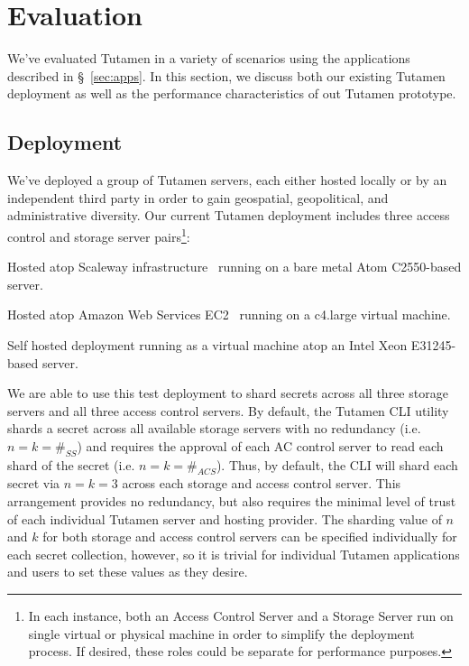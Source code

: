 \section{Evaluation}
\label{sec:eval}

We've evaluated Tutamen in a variety of scenarios using the
applications described in \S~\ref{sec:apps}. In this section, we
discuss both our existing Tutamen deployment as well as the
performance characteristics of out Tutamen prototype.

\subsection{Deployment}
\label{sec:eval:deployment}

We've deployed a group of Tutamen servers, each either hosted locally
or by an independent third party in order to gain geospatial,
geopolitical, and administrative diversity. Our current Tutamen
deployment includes three access control and storage server
pairs\footnote{In each instance, both an Access Control Server and a
  Storage Server run on single virtual or physical machine in order to
  simplify the deployment process. If desired, these roles could be
  separate for performance purposes.}:

\begin{packed_desc}
\item[Paris, France:] Hosted atop Scaleway infrastructure~\cite{scaleway}
  running on a bare metal Atom C2550-based server.
\item[North Virginia:] Hosted atop Amazon Web Services
  EC2~\cite{amazon-ec2} running on a c4.large virtual machine.
\item[Boulder, CO:] Self hosted deployment running as a virtual machine
  atop an Intel Xeon E31245-based server.
\end{packed_desc}

We are able to use this test deployment to shard secrets across all
three storage servers and all three access control servers. By
default, the Tutamen CLI utility shards a secret across all available
storage servers with no redundancy (i.e. $n=k=\#_{SS}$) and requires
the approval of each AC control server to read each shard of the
secret (i.e. $n=k=\#_{ACS}$). Thus, by default, the CLI will shard
each secret via $n=k=3$ across each storage and access control
server. This arrangement provides no redundancy, but also requires the
minimal level of trust of each individual Tutamen server and hosting
provider. The sharding value of $n$ and $k$ for both storage and
access control servers can be specified individually for each secret
collection, however, so it is trivial for individual Tutamen
applications and users to set these values as they desire.

